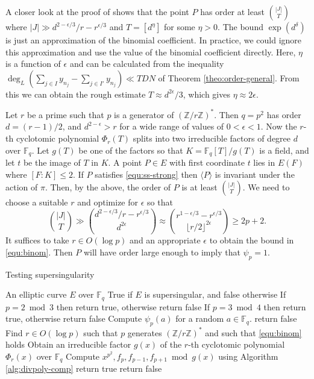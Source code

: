 \documentclass[12pt]{article}
\theoremstyle{plain}
\theoremstyle{definition}
\newcommand{\ang}[1]{\langle#1\rangle}
\newcommand{\abs}[1]{\left\vert#1\right\vert}
\def\Z{\ensuremath{\mathbb{Z}}}
\def\F{\ensuremath{\mathbb{F}}}
\begin{document}
A closer look at the proof of \cite[Theorem 1.1]{voloch2010} shows that the point $P$ has order at 
least $\binom{\abs{J}}{T}$ where $\abs{J} \gg d^{2 - \epsilon / 3} / r - r^{\epsilon / 3}$ and $T = 
[d^\eta]$ for some $\eta > 0$. The bound $\exp(d^\delta)$ is just an approximation of the binomial 
coefficient. In practice, we could ignore this approximation and use the value of the binomial 
coefficient directly. Here, $\eta$ is a function of $\epsilon$ and can be calculated from the 
inequality $\deg_L(\sum_{j \in I}y_{n_j} - \sum_{j \in I'}y_{n_j}) \ll TDN $ of Theorem 
\ref{theo:order-general}. From this we can obtain the rough estimate $T \approx d^{2\epsilon} / 3$, 
which gives $\eta \approx 2\epsilon$. 

Let $r$ be a prime such that $p$ is a generator of $(\Z/r\Z)^*$. Then $q = p^2$ has order $d = 
(r - 1) / 2$, and $d^{2 - \epsilon} > r$ for a wide range of values of $0 < \epsilon < 1$. Now the 
$r$-th cyclotomic polynomial $\Phi_r(T)$ splits into two irreducible factors of degree $d$ over 
$\F_q$. Let $g(T)$ be one of the factors so that $K = \F_q[T]/g(T)$ is a field, and let $t$ be the 
image of $T$ in $K$. A point $P \in E$ with first coordinate $t$ lies in $E(F)$ where $[F : K] \le 
2$. If $P$ satisfies \eqref{equ:ss-strong} then $\ang{P}$ is invariant under the action of $\pi$. 
Then, by the above, the order of $P$ is at least $\binom{\abs{J}}{T}$. We need to choose a suitable 
$r$ and optimize for $\epsilon$ so that
\begin{equation}
	\label{equ:binom}
	\binom{\abs{J}}{T} \gg \binom{d^{2 - \epsilon / 3} / r - r^{\epsilon / 3}}{d^{2\epsilon}} 
	\approx \binom{r^{1 - \epsilon / 3} - r^{\epsilon / 3}}{\lfloor r / 2 \rfloor^{2\epsilon}} \ge 
	2p + 2.
\end{equation}
It suffices to take $r \in O(\log p)$ and an appropriate $\epsilon$ to obtain the bound in 
\eqref{equ:binom}. Then $P$ will have order large enough to imply that $\psi_p = 1$. 

\begin{algorithm}[H]
	\caption{Testing supersingularity}
	\label{alg:ss-strong}
	\begin{algorithmic}[1]
		\REQUIRE An elliptic curve $E$ over $\F_q$
		\ENSURE True if $E$ is supersingular, and false otherwise
			\STATE If $p = 2 \bmod 3$ then return true, otherwise return false
		\ENDIF
			\STATE If $p = 3 \bmod 4$ then return true, otherwise return false
		\ENDIF
		\STATE\label{step:ss-eval}
		Compute $\psi_p(a)$ for a random $a \in \F_q$.
			\STATE return false
		\ENDIF
		\STATE\label{step:ss-find-par}
		Find $r \in O(\log p)$ such that $p$ generates $(\Z/r\Z)^*$ and such that \eqref{equ:binom} 
		holds
		\STATE\label{step:cyclo}
		Obtain an irreducible factor $g(x)$ of the $r$-th cyclotomic polynomial $\Phi_r(x)$ over 
		$\F_q$
		\STATE\label{step:ss-psi}
		Compute $x^{p^2}, f_p, f_{p - 1}, f_{p + 1} \bmod g(x)$ using Algorithm 
		\ref{alg:divpoly-comp}
			\STATE return true
		\ELSE
			\STATE return false
		\ENDIF
	\end{algorithmic}
\end{algorithm}
\end{document}
